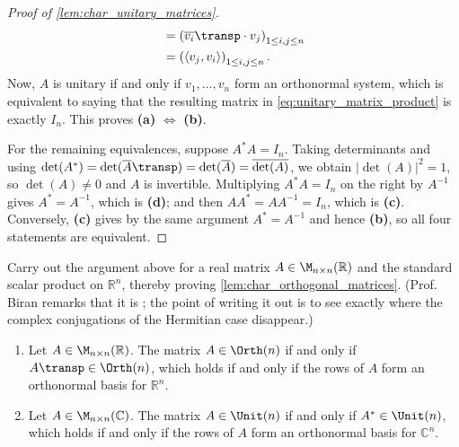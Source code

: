 \begin{proof}[Proof of \cref{lem:char_unitary_matrices}]
\begin{align}
    &= \left( \overline{v_i}\transp \cdot v_j \right)_{1 \leq i, j \leq n} \nonumber \\
    \label{eq:unitary_matrix_product}
    &= \left( \langle v_j, v_i \rangle \right)_{1 \leq i, j \leq n}.
\end{align}
Now, $A$ is unitary if and only if $v_1, \dots, v_n$ form an orthonormal system, which is equivalent to saying that the resulting matrix in \eqref{eq:unitary_matrix_product} is exactly $I_n$. This proves \textbf{(a)} $\iff$ \textbf{(b)}.

For the remaining equivalences, suppose $A^* A = I_n$. Taking determinants and using $\det(A^*) = \det(\overline{A}\transp) = \det(\overline{A}) = \overline{\det(A)}$, we obtain $\left| \det(A) \right|^2 = 1$, so $\det(A) \ne 0$ and $A$ is invertible. Multiplying $A^* A = I_n$ on the right by $A^{-1}$ gives $A^* = A^{-1}$, which is \textbf{(d)}; and then $A A^* = A A^{-1} = I_n$, which is \textbf{(c)}. Conversely, \textbf{(c)} gives by the same argument $A^* = A^{-1}$ and hence \textbf{(b)}, so all four statements are equivalent.
\end{proof}

\begin{exercise}
\label{exc:char_orthogonal_matrices_proof}
Carry out the argument above for a real matrix $A \in \M_{n \times n}(\mathbb{R})$ and the standard scalar product on $\mathbb{R}^n$, thereby proving \cref{lem:char_orthogonal_matrices}. (Prof. Biran remarks that it is ; the point of writing it out is to see exactly where the complex conjugations of the Hermitian case disappear.)
\end{exercise}

\begin{corollary}
\label{cor:rows_orthogonal_unitary}
\begin{enumerate}[label=\textbf{(\alph*)}]
    \item Let $A \in \M_{n \times n}(\mathbb{R})$. The matrix $A \in \Orth(n)$ if and only if $A\transp \in \Orth(n)$, which holds if and only if the rows of $A$ form an orthonormal basis for $\mathbb{R}^n$.
    \item Let $A \in \M_{n \times n}(\mathbb{C})$. The matrix $A \in \Unit(n)$ if and only if $A^* \in \Unit(n)$, which holds if and only if the rows of $A$ form an orthonormal basis for $\mathbb{C}^n$.
\end{enumerate}
\end{corollary}


